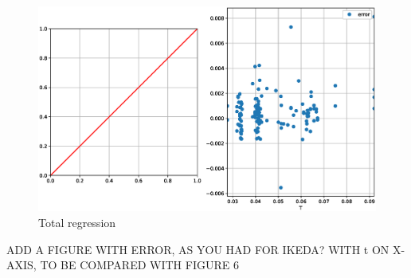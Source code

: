 \begin{figure}[H]
    \centering
    \includegraphics[width=\columnwidth]{figures/B_e_factor_regression_total.eps}
    \caption{Total regression}
    \label{fig:B_e_factor_regression_total}
\end{figure}

ADD A FIGURE WITH ERROR, AS YOU HAD FOR IKEDA? WITH t ON X-AXIS, TO BE COMPARED WITH FIGURE 6

